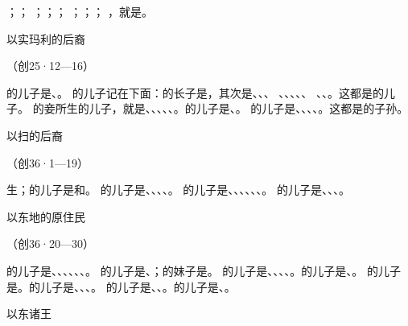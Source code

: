 {\par }{\PP {}；{}{}{}；
；{}{}{}；{}{}{}；
；{}{}{}；{}{}{}；
，{}就是{}。
\par }{\SH 以实玛利的后裔
\par }{\R （创25·12—16）
\par }{\PP {}的儿子是{}、{}。
的儿子记在下面：{}的长子是{}，其次是{}、{}、{}、
、{}、{}、{}、{}、
、{}、{}。这都是{}的儿子。
的妾{}所生的儿子，就是{}、{}、{}、{}、{}、{}。{}的儿子是{}、{}。
的儿子是{}、{}、{}、{}、{}。这都是{}的子孙。
\par }{\SH 以扫的后裔
\par }{\R （创36·1—19）
\par }{\PP {}生{}；{}的儿子是{}和{}。
的儿子是{}、{}、{}、{}、{}。
的儿子是{}、{}、{}、{}、{}、{}、{}。
的儿子是{}、{}、{}、{}。
\par }{\SH 以东地的原住民
\par }{\R （创36·20—30）
\par }{\PP {}的儿子是{}、{}、{}、{}、{}、{}、{}。
的儿子是{}、{}；{}的妹子是{}。
的儿子是{}、{}、{}、{}、{}。{}的儿子是{}、{}。
的儿子是{}。{}的儿子是{}、{}、{}、{}。
的儿子是{}、{}、{}。{}的儿子是{}、{}。
\par }{\SH 以东诸王
}

